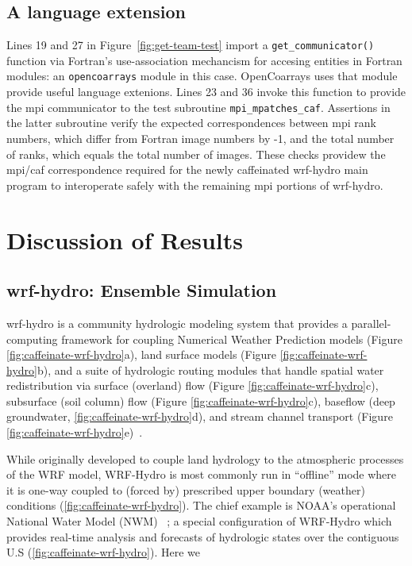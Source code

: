 \subsection{A language extension}
Lines 19 and 27 in Figure~\ref{fig:get-team-test} import a \texttt{get\_communicator()} function via Fortran's
use-association mechancism for accesing entities in Fortran modules: an \texttt{opencoarrays} module in this
case.  OpenCoarrays uses that module provide useful language extenions.  Lines 23 and 36 invoke this function
to provide the \gls{mpi} communicator to the test subroutine \texttt{mpi\_mpatches\_caf}.  Assertions in the
latter subroutine verify the expected correspondences between \gls{mpi} rank numbers, which differ from
Fortran image numbers by -1, and the total number of ranks, which equals the total number of images.
These checks providew the \gls{mpi}/\gls{caf} correspondence required for the newly caffeinated \gls{wrf-hydro}
main program to interoperate safely with the remaining \gls{mpi} portions of \gls{wrf-hydro}.

\section{Discussion of Results}\label{sec:discussion}
\subsection{\gls{wrf-hydro}: Ensemble Simulation}
\gls{wrf-hydro} is a community hydrologic modeling system that provides a parallel-computing
framework for coupling Numerical Weather Prediction models (Figure \ref{fig:caffeinate-wrf-hydro}a), land surface models
(Figure \ref{fig:caffeinate-wrf-hydro}b), and a suite of hydrologic routing modules that handle spatial water redistribution
via surface (overland) flow (Figure \ref{fig:caffeinate-wrf-hydro}c), subsurface (soil column) flow (Figure \ref{fig:caffeinate-wrf-hydro}c),
baseflow (deep groundwater, \ref{fig:caffeinate-wrf-hydro}d), and stream channel transport
(Figure \ref{fig:caffeinate-wrf-hydro}e)~\cite{gochisEtal2014}.

While originally developed to couple land hydrology to the atmospheric processes of
the WRF model, WRF-Hydro is most commonly run in ``offline'' mode where it is one-way
coupled to (forced by) prescribed upper boundary (weather)
conditions (\ref{fig:caffeinate-wrf-hydro}). The chief example is NOAA's operational
National Water Model (NWM) ~\cite{noaa2016}; a special configuration of
WRF-Hydro which provides real-time analysis and forecasts of
hydrologic states over the contiguous U.S (\ref{fig:caffeinate-wrf-hydro}). Here we

